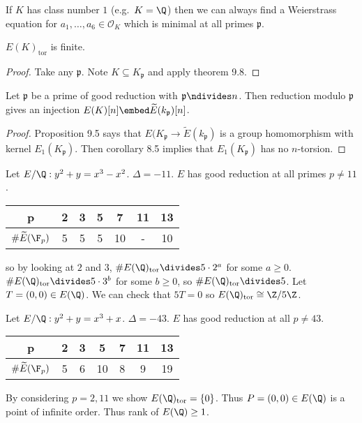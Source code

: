 \documentclass[a4paper]{article}
\theoremstyle{definition}
\renewcommand*{\O}{\mathcal{O}}
\begin{document}
\begin{remark}
  If \(K\) has class number \(1\) (e.g.\ \(K = \Q\)) then we can always find a Weierstrass equation for \(a_1, \dots, a_6 \in \O_K\) which is minimal at all primes \(\mathfrak p\).
\end{remark}

\begin{lemma}
  \(E(K)_{\mathrm{tor}}\) is finite.
\end{lemma}

\begin{proof}
  Take any \(\mathfrak p\). Note \(K \subseteq K_{\mathfrak p}\) and apply theorem 9.8.
\end{proof}

\begin{lemma}
  Let \(\mathfrak p\) be a prime of good reduction with \(\mathfrak p \ndivides n\). Then reduction modulo \(\mathfrak p\) gives an injection \(E(K)[n] \embed \widetilde E(k_{\mathfrak p})[n]\).
\end{lemma}

\begin{proof}
  Proposition 9.5 says that \(E(K_{\mathfrak p} \to \widetilde E(k_{\mathfrak p})\) is a group homomorphism with kernel \(E_1(K_{\mathfrak p})\). Then corollary 8.5 implies that \(E_1(K_{\mathfrak p})\) has no \(n\)-torsion.
\end{proof}

\begin{eg}
  Let \(E/\Q: y^2 + y = x^3 - x^2\). \(\Delta = -11\). \(E\) has good reduction at all primes \(p \neq 11\).
  \begin{table}[h]
    \centering
    \begin{tabular}{c|cccccc}
      p & 2 & 3 & 5 & 7 & 11 & 13 \\ \hline
      \(\# \widetilde E(\F_p)\) & 5 & 5 & 5 & 10 & - & 10
    \end{tabular}
  \end{table}
  so by looking at \(2\) and \(3\), \(\#E(\Q)_{\mathrm{tor}} \divides 5 \cdot 2^a\) for some \(a \geq 0\). \(\#E(\Q)_{\mathrm{tor}} \divides 5 \cdot 3^b\) for some \(b \geq 0\), so \(\#E(\Q)_{\mathrm{tor}} \divides 5\). Let \(T = (0, 0) \in E(\Q)\). We can check that \(5T = 0\) so \(E(\Q)_{\mathrm{tor}} \cong \Z/5\Z\).
\end{eg}

\begin{eg}
  Let \(E/\Q: y^2 + y = x^3 + x\). \(\Delta = -43\). \(E\) has good reduction at all \(p \neq 43\).
  \begin{table}[h]
    \centering
    \begin{tabular}{c|cccccc}
      p & 2 & 3 & 5 & 7 & 11 & 13 \\ \hline
      \(\# \widetilde E(\F_p)\) & 5 & 6 & 10 & 8 & 9 & 19
    \end{tabular}
  \end{table}
  By considering \(p = 2, 11\) we show \(E(\Q)_{\mathrm{tor}} = \{0\}\). Thus \(P = (0, 0) \in E(\Q)\) is a point of infinite order. Thus rank of \(E(\Q) \geq 1\).
\end{eg}
\end{document}
